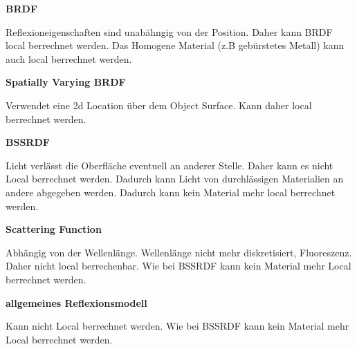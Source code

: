 \documentclass[a4paper,10pt,DIV=14]{article}
\begin{document}
\textbf{BRDF}

Reflexioneigenschaften sind unabähngig von der Position. Daher kann BRDF local berrechnet werden.
Das Homogene Material (z.B gebürstetes Metall) kann auch local berrechnet werden.

\textbf{Spatially Varying BRDF}

Verwendet eine 2d Location über dem Object Surface. Kann daher local berrechnet werden.

\textbf{BSSRDF}

Licht verlässt die Oberfläche eventuell an anderer Stelle. Daher kann es nicht Local berrechnet werden.
Dadurch kann Licht von durchlässigen Materialien an andere abgegeben werden.
Dadurch kann kein Material mehr local berrechnet werden.

\textbf{Scattering Function}

Abhängig von der Wellenlänge. Wellenlänge nicht mehr diskretisiert, Fluoreszenz. Daher nicht local berrechenbar.
Wie bei BSSRDF kann kein Material mehr Local berrechnet werden.

\textbf{allgemeines Reflexionsmodell}

Kann nicht Local berrechnet werden.
Wie bei BSSRDF kann kein Material mehr Local berrechnet werden.

\end{document}
